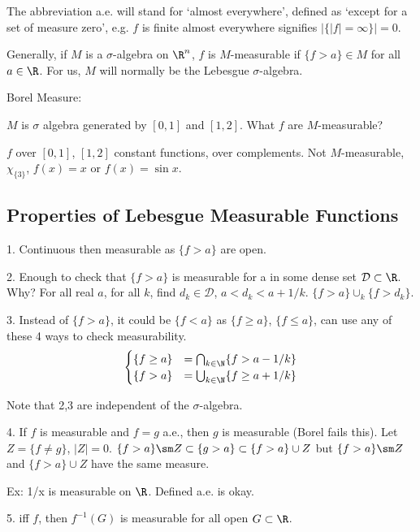 \begin{dfn}
The abbreviation a.e. will stand for `almost everywhere', defined as `except for a set of measure zero', e.g. $f$ is finite almost everywhere signifies $|\{ |f|=\infty\}|=0$. 
\end{dfn}


Generally, if $M$ is a $\sigma$-algebra on $\R^n$, $f$ is $M$-measurable if $\{f>a\} \in M$ for all $a \in \R$. For us, $M$ will normally be the Lebesgue $\sigma$-algebra. 


Borel Measure: 

$M$ is $\sigma$ algebra generated by $[0,1]$ and $[1,2]$. What $f$ are $M$-measurable?

$f$ over $[0,1]$, $[1,2]$ constant functions, over complements. Not $M$-measurable, $\chi_{\{3\}}$, $f(x)=x$ or $f(x)= \sin x$. 




\subsection{Properties of Lebesgue Measurable Functions}

1. Continuous then measurable as $\{f>a\}$ are open.

2. Enough to check that $\{f>a\}$ is measurable for a in some dense set $\mathcal{D} \subset \R$. Why? For all real $a$, for all $k$, find $d_k \in \mathcal{D}$, $a<d_k<a+1/k$. $\{f>a\} \cup_k \{f>d_k\}$.

3. Instead of $\{f>a\}$, it could be $\{f<a\}$ as $\{f \geq a\}$, $\{ f \leq a\}$, can use any of these 4 ways to check measurability.
	\[
	\begin{cases}
	\{f \geq a\}&= \bigcap_{k \in \N} \{f>a-1/k\} \\
	\{f>a\}&= \bigcup_{k \in \N} \{f \geq a+1/k\}
	\end{cases}
	\]

Note that 2,3 are independent of the $\sigma$-algebra. 


4. If $f$ is measurable and $f=g$ a.e., then $g$ is measurable (Borel fails this). Let $Z=\{f \neq g\}$, $|Z|=0$. $\{f>a\} \sm Z \subset \{g>a\} \subset \{f>a\} \cup Z$ but $\{f>a\} \sm Z$ and $\{f>a\} \cup Z$ have the same measure. 

Ex: 1/x is measurable on $\R$. Defined a.e. is okay. 


5. iff $f$, then $f^{-1}(G)$ is measurable for all open $G \subset \R$.

